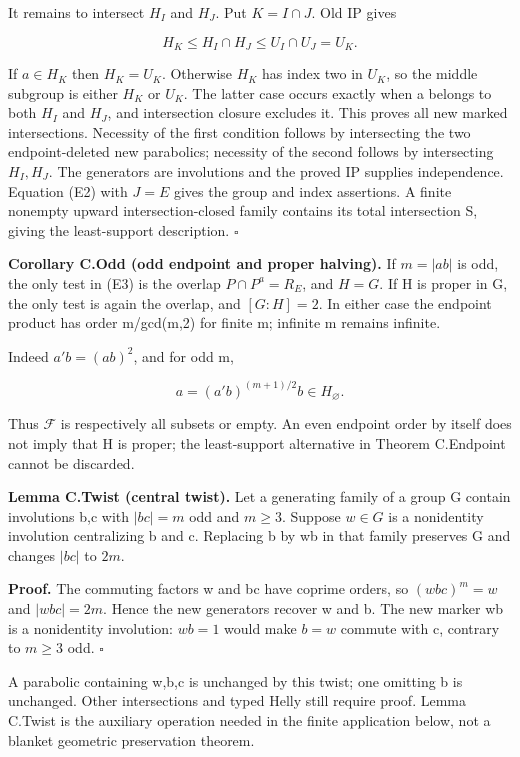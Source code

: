 It remains to intersect \(H_I\) and \(H_J\). Put \(K=I\cap J\). Old IP
gives

\[
H_K\le H_I\cap H_J\le U_I\cap U_J=U_K.
\tag{E5}
\]

If \(a\in H_K\) then \(H_K=U_K\). Otherwise \(H_K\) has index two in
\(U_K\), so the middle subgroup is either \(H_K\) or \(U_K\). The latter
case occurs exactly when a belongs to both \(H_I\) and \(H_J\), and
intersection closure excludes it. This proves all new marked
intersections. Necessity of the first condition follows by intersecting
the two endpoint-deleted new parabolics; necessity of the second follows
by intersecting \(H_I,H_J\). The generators are involutions and the
proved IP supplies independence. Equation (E2) with \(J=E\) gives the
group and index assertions. A finite nonempty upward intersection-closed
family contains its total intersection S, giving the least-support
description. \(\square\)

\textbf{Corollary C.Odd (odd endpoint and proper halving).} If
\(m=|ab|\) is odd, the only test in (E3) is the overlap
\(P\cap P^a=R_E\), and \(H=G\). If H is proper in G, the only test is
again the overlap, and \([G:H]=2\). In either case the endpoint product
has order m/gcd(m,2) for finite m; infinite m remains infinite.

Indeed \(a'b=(ab)^{2}\), and for odd m,

\[
a=(a'b)^{(m+1)/2}b\in H_\varnothing.
\]

Thus \(\mathcal F\) is respectively all subsets or empty. An even
endpoint order by itself does not imply that H is proper; the
least-support alternative in Theorem C.Endpoint cannot be discarded.

\textbf{Lemma C.Twist (central twist).} Let a generating family of a group G contain
involutions b,c with \(|bc|=m\) odd and \(m\ge 3\). Suppose
\(w\in G\) is a nonidentity involution centralizing b and c. Replacing
b by wb in that family preserves G and changes \(|bc|\) to \(2m\).

\textbf{Proof.} The commuting factors w and bc have coprime orders, so
\((wbc)^m=w\) and \(|wbc|=2m\). Hence the new generators recover w and
b. The new marker wb is a nonidentity involution: \(wb=1\) would make
\(b=w\) commute with c, contrary to \(m\ge 3\) odd. \(\square\)

A parabolic containing w,b,c is unchanged by this twist; one omitting b
is unchanged. Other intersections and typed Helly still require proof.
Lemma C.Twist is the auxiliary operation needed in the finite
application below, not a blanket geometric preservation theorem.
